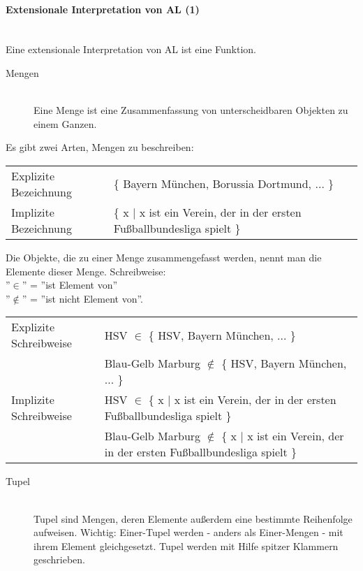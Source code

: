 \documentclass{scrartcl}
\begin{document}
\paragraph{Extensionale Interpretation von AL (1)} \mbox{}\\

Eine extensionale Interpretation von AL ist eine Funktion.

\begin{description}
	\item[Mengen] \mbox{}\\ Eine Menge ist eine Zusammenfassung von unterscheidbaren Objekten zu einem Ganzen. 
\end{description}

Es gibt zwei Arten, Mengen zu beschreiben: \\

\begin{tabularx}{\linewidth}{l X}
	Explizite Bezeichnung & \{ Bayern München, Borussia Dortmund, $ \ldots $ \} \\
	Implizite Bezeichnung & \{ x $ \mid $ x ist ein Verein, der in der ersten Fußballbundesliga spielt \}
\end{tabularx}

Die Objekte, die zu einer Menge zusammengefasst werden, nennt man die Elemente dieser Menge. Schreibweise: \\

''$ \in $'' = ''ist Element von''\\
''$ \not \in $'' = ''ist nicht Element von''. \\
 
\begin{tabularx}{\linewidth}{l X}
	Explizite Schreibweise & HSV $ \in $ \{ HSV, Bayern München, $ \ldots $ \} \\
	& Blau-Gelb Marburg $ \not \in $ \{ HSV, Bayern München, $ \ldots $ \} \\
	Implizite Schreibweise & HSV $ \in $ \{ x $ \mid $ x ist ein Verein, der in der ersten Fußballbundesliga spielt \} \\
	& Blau-Gelb Marburg $ \not \in $ \{ x $ \mid $ x ist ein Verein, der in der ersten Fußballbundesliga spielt \}
\end{tabularx} 

\begin{description}
	\item[Tupel] \mbox{}\\ Tupel sind Mengen, deren Elemente außerdem eine bestimmte Reihenfolge aufweisen. Wichtig: Einer-Tupel werden - anders als Einer-Mengen - mit ihrem Element gleichgesetzt. Tupel werden mit Hilfe spitzer Klammern geschrieben.
\end{description}
\end{document}
